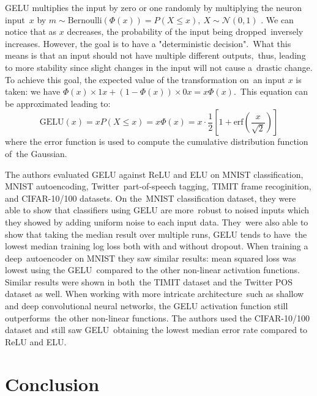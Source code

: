 \documentclass[12pt]{article}
\begin{document}
\text{\newline}

GELU multiplies the input by zero or one randomly by multiplying the neuron input\
$x$ by \( m \sim  \text{Bernoulli}(\Phi(x))=P(X \leq x),\ X \sim \mathcal{N}(0,1)\)
.  We can notice that as $x$ decreases, the probability of the input being dropped\
inversely increases. However, the goal is to have a "deterministic decision".\
What this means is that an input should not have multiple different outputs,\
thus, leading to more stability since slight changes in the input will not cause a\
drastic change. To achieve this goal, the expected value of the transformation on\
an input $x$ is taken: we have \( \Phi(x) \times 1x + (1 - \Phi(x)) \times 0x = x\Phi(x) \).\
This equation can be approximated leading to:
\[
    \text{GELU}(x) = xP(X \leq x) = x\Phi(x) = x \cdot \frac{1}{2}\left [1 + \text{erf}
    \left(\frac{x}{\sqrt{2}}\right) \right]
\]
where the error function is used to compute the cumulative distribution function of\
the Gaussian.

\text{\newline}

The authors evaluated GELU against ReLU and ELU on MNIST classification, MNIST autoencoding, 
Twitter\ part-of-speech tagging, TIMIT frame recoginition, and CIFAR-10/100 datasets. On the\
MNIST classification dataset, they were able to show that classifiers using GELU are more\
robust to noised inputs which they showed by adding uniform noise to each input data. They\
were also able to show that taking the median result over multiple runs, GELU tends to have\
the lowest median training log loss both with and without dropout. When training a deep\
autoencoder on MNIST they saw similar results: mean squared loss was lowest using the GELU\
compared to the other non-linear activation functions. Similar results were shown in both\
the TIMIT dataset and the Twitter POS dataset as well. When working with more intricate architecture\
such as shallow and deep convolutional neural networks, the GELU activation function still outperforms\
the other non-linear functions. The authors used the CIFAR-10/100 dataset and still saw GELU\
obtaining the lowest median error rate compared to ReLU and ELU.


\section{Conclusion}
\end{document}
